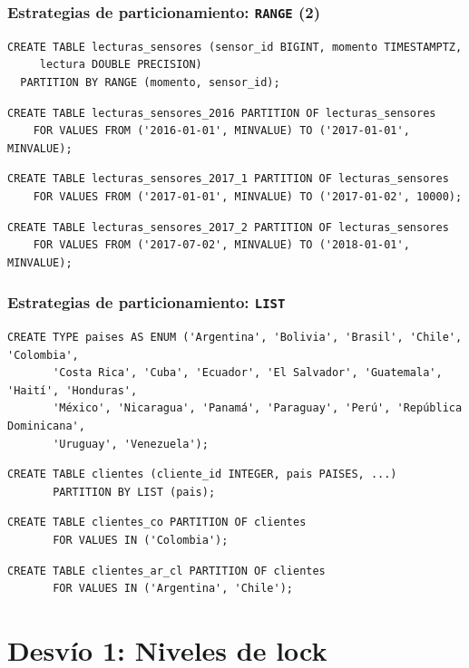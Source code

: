 \documentclass[ignorenonframetext,t]{beamer}
\begin{document}
\begin{frame}[fragile]
	\frametitle{Estrategias de particionamiento: \texttt{RANGE} (2)}
\begin{lstlisting}
CREATE TABLE lecturas_sensores (sensor_id BIGINT, momento TIMESTAMPTZ,
     lectura DOUBLE PRECISION)
  PARTITION BY RANGE (momento, sensor_id);
\end{lstlisting}
\pause
\begin{lstlisting}
CREATE TABLE lecturas_sensores_2016 PARTITION OF lecturas_sensores
	FOR VALUES FROM ('2016-01-01', MINVALUE) TO ('2017-01-01', MINVALUE);
\end{lstlisting}
\pause
\begin{lstlisting}
CREATE TABLE lecturas_sensores_2017_1 PARTITION OF lecturas_sensores
    FOR VALUES FROM ('2017-01-01', MINVALUE) TO ('2017-01-02', 10000);
\end{lstlisting}
\pause
\begin{lstlisting}
CREATE TABLE lecturas_sensores_2017_2 PARTITION OF lecturas_sensores
	FOR VALUES FROM ('2017-07-02', MINVALUE) TO ('2018-01-01', MINVALUE);
\end{lstlisting}

\end{frame}

\begin{frame}[fragile]
	\frametitle{Estrategias de particionamiento: \texttt{LIST}}
\begin{lstlisting}
CREATE TYPE paises AS ENUM ('Argentina', 'Bolivia', 'Brasil', 'Chile', 'Colombia',
       'Costa Rica', 'Cuba', 'Ecuador', 'El Salvador', 'Guatemala', 'Haití', 'Honduras',
       'México', 'Nicaragua', 'Panamá', 'Paraguay', 'Perú', 'República Dominicana',
       'Uruguay', 'Venezuela');
\end{lstlisting}
\begin{lstlisting}
CREATE TABLE clientes (cliente_id INTEGER, pais PAISES, ...)
       PARTITION BY LIST (pais);
\end{lstlisting}
\pause
\begin{lstlisting}
CREATE TABLE clientes_co PARTITION OF clientes
       FOR VALUES IN ('Colombia');
\end{lstlisting}
\begin{lstlisting}
CREATE TABLE clientes_ar_cl PARTITION OF clientes
       FOR VALUES IN ('Argentina', 'Chile');
\end{lstlisting}
\end{frame}

\section{Desvío 1: Niveles de lock}
\end{document}
